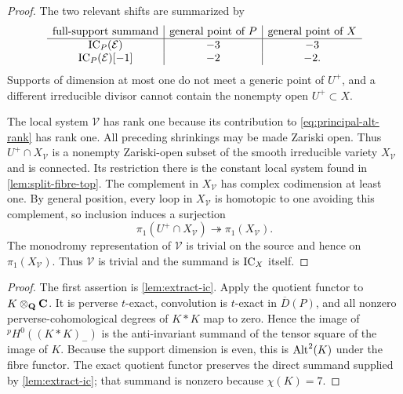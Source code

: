 \begin{proof}
The two relevant shifts are summarized by
\[
\begin{array}{c|c|c}
\text{full-support summand}&\text{general point of }P&\text{general point of }X\\ \hline
\operatorname{IC}_P(\mathcal E)&-3&-3\\
\operatorname{IC}_P(\mathcal E)[-1]&-2&-2.
\end{array}
\]
Supports of dimension at most one do not meet a generic point of $U^+$, and
a different irreducible divisor cannot contain the nonempty open $U^+\subset
X$.

The local system $\mathcal V$ has rank one because its contribution to
\eqref{eq:principal-alt-rank} has rank one.  All preceding shrinkings may be
made Zariski open.  Thus $U^+\cap X_{\mathcal V}$ is a nonempty Zariski-open
subset of the smooth irreducible variety $X_{\mathcal V}$ and is connected.
Its restriction there is the constant local system found in
\cref{lem:split-fibre-top}.  The complement in $X_{\mathcal V}$ has complex
codimension at least one.  By general position, every loop in
$X_{\mathcal V}$ is homotopic to one avoiding this complement, so inclusion
induces a surjection
\[
 \pi_1(U^+\cap X_{\mathcal V})\twoheadrightarrow
 \pi_1(X_{\mathcal V}).
\]
The monodromy representation of $\mathcal V$ is trivial on the source and
hence on $\pi_1(X_{\mathcal V})$.  Thus $\mathcal V$ is trivial and the
summand is $\operatorname{IC}_X$ itself.
\end{proof}


\begin{proof}
The first assertion is \cref{lem:extract-ic}.  Apply the quotient functor to
$K\otimes_{\mathbf Q}\mathbf C$.  It is perverse $t$-exact, convolution is $t$-exact in
$\overline D(P)$, and all nonzero perverse-cohomological degrees of $K*K$ map
to zero.  Hence the
image of ${}^pH^0((K*K)_-)$ is the anti-invariant summand of the tensor square
of the image of $K$.  Because the support dimension is even, this is
$\operatorname{Alt}^2(K)$ under the fibre functor.  The exact quotient functor preserves
the direct summand supplied by \cref{lem:extract-ic}; that summand is nonzero
because $\chi(K)=7$.
\end{proof}

